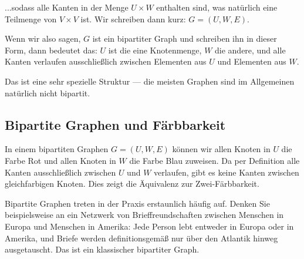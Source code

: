 \begin{spoken-clean}[00:58:30 - 00:59:56]
...sodass alle Kanten in der Menge $U \times W$ enthalten sind, was natürlich eine Teilmenge von $V \times V$ ist. Wir schreiben dann kurz: $G = (U, W, E)$.

Wenn wir also sagen, $G$ ist ein bipartiter Graph und schreiben ihn in dieser Form, dann bedeutet das: $U$ ist die eine Knotenmenge, $W$ die andere, und alle Kanten verlaufen ausschließlich zwischen Elementen aus $U$ und Elementen aus $W$.

Das ist eine sehr spezielle Struktur --- die meisten Graphen sind im Allgemeinen natürlich nicht bipartit.
\end{spoken-clean}


\subsection{Bipartite Graphen und Färbbarkeit}

\begin{math-stroke}

\begin{explanation-of-steps}
In einem bipartiten Graphen $G = (U, W, E)$ können wir allen Knoten in $U$ die Farbe Rot und allen Knoten in $W$ die Farbe Blau zuweisen. Da per Definition alle Kanten ausschließlich zwischen $U$ und $W$ verlaufen, gibt es keine Kanten zwischen gleichfarbigen Knoten. Dies zeigt die Äquivalenz zur Zwei-Färbbarkeit.
\end{explanation-of-steps}
\end{math-stroke}

\begin{spoken-clean}[00:59:56 - 01:01:08]
Bipartite Graphen treten in der Praxis erstaunlich häufig auf. Denken Sie beispielsweise an ein Netzwerk von Brieffreundschaften zwischen Menschen in Europa und Menschen in Amerika: Jede Person lebt entweder in Europa oder in Amerika, und Briefe werden definitionsgemäß nur über den Atlantik hinweg ausgetauscht. Das ist ein klassischer bipartiter Graph.
\end{spoken-clean}

